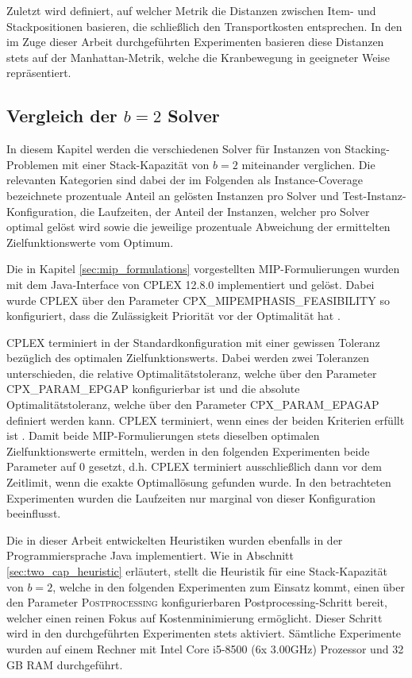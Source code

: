 Zuletzt wird definiert, auf welcher Metrik die Distanzen zwischen Item- und Stackpositionen
basieren, die schließlich den Transportkosten entsprechen. In den im Zuge dieser Arbeit durchgeführten
Experimenten basieren diese Distanzen stets auf der Manhattan-Metrik, welche die Kranbewegung
in geeigneter Weise repräsentiert.

\subsection{Vergleich der $b = 2$ Solver}
\label{sec:solver_comp_b=2}

In diesem Kapitel werden die verschiedenen Solver für Instanzen von Stacking-Problemen mit einer Stack-Kapazität von $b=2$ miteinander verglichen. Die relevanten Kategorien sind dabei der im Folgenden als Instance-Coverage bezeichnete prozentuale Anteil an gelösten Instanzen pro Solver und Test-Instanz-Konfiguration, die Laufzeiten, der Anteil der Instanzen, welcher pro Solver optimal gelöst wird
sowie die jeweilige prozentuale Abweichung der ermittelten Zielfunktionswerte vom Optimum.

Die in Kapitel \ref{sec:mip_formulations} vorgestellten MIP-Formulierungen wurden mit dem Java-Interface von CPLEX 12.8.0 implementiert
und gelöst. Dabei wurde CPLEX über den Parameter \textsc{CPX\_MIPEMPHASIS\_FEASIBILITY} so konfiguriert, dass die Zulässigkeit
Priorität vor der Optimalität hat \cite{IBM_DOC}.

\vfill
\pagebreak

CPLEX terminiert in der Standardkonfiguration mit einer gewissen Toleranz bezüglich des optimalen Zielfunktionswerts.
Dabei werden zwei Toleranzen unterschieden, die relative Optimalitätstoleranz, welche über den Parameter
\textsc{CPX\_PARAM\_EPGAP} konfigurierbar ist und die absolute Optimalitätstoleranz, welche über den Parameter
\textsc{CPX\_PARAM\_EPAGAP} definiert werden kann. CPLEX terminiert, wenn eines der beiden Kriterien erfüllt ist \cite{CPLEX2015}.
Damit beide MIP-Formulierungen stets dieselben optimalen Zielfunktionswerte ermitteln, werden in den folgenden
Experimenten beide Parameter auf $0$ gesetzt, d.h. CPLEX terminiert ausschließlich dann vor dem Zeitlimit,
wenn die exakte Optimallösung gefunden wurde. In den betrachteten Experimenten wurden die Laufzeiten nur marginal
von dieser Konfiguration beeinflusst.

Die in dieser Arbeit entwickelten Heuristiken wurden ebenfalls in der Programmiersprache Java implementiert.
Wie in Abschnitt \ref{sec:two_cap_heuristic} erläutert, stellt die Heuristik für eine Stack-Kapazität von $b = 2$,
welche in den folgenden Experimenten zum Einsatz kommt, einen über den Parameter \textsc{Postprocessing} konfigurierbaren
Postprocessing-Schritt bereit, welcher einen reinen Fokus auf Kostenminimierung ermöglicht. Dieser Schritt wird
in den durchgeführten Experimenten stets aktiviert.
Sämtliche Experimente wurden auf einem Rechner mit Intel Core i5-8500 (6x 3.00GHz) Prozessor und 32 GB RAM durchgeführt.

